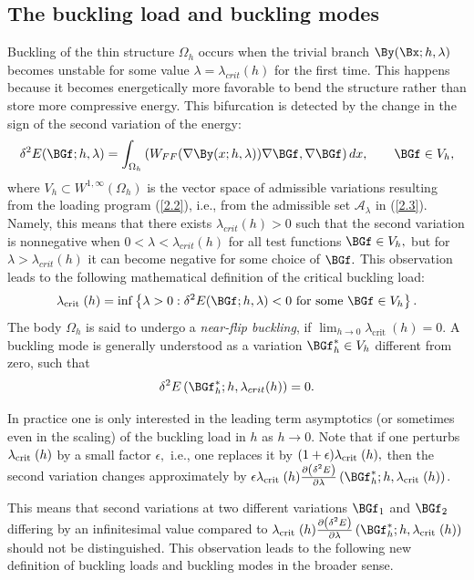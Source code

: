 \subsection{The buckling load and buckling modes}

Buckling of the thin structure $\Omega_h$ occurs when the trivial branch $\By(\Bx; h, \lambda)$ becomes unstable for some value $\lambda=\lambda_{crit}(h)$ for the first time. This happens because it becomes energetically more favorable to bend the structure rather than store more compressive energy. This bifurcation is detected by the change in the sign of the second variation of the energy:
\begin{equation}
\label{2.6}
\delta^{2}E(\BGf ; h, \lambda)=\int_{\Omega_{h}}\left(W_{F F}(\nabla \By(x ; h, \lambda)) \nabla \BGf, \nabla \BGf \right) d x, \qquad \BGf \in V_h,
\end{equation}
where $V_h\subset W^{1,\infty}(\Omega_h)$ is the vector space of admissible variations resulting from the loading program (\ref{2.2}), i.e., from the admissible set 
$\mathcal{A}_\lambda$ in (\ref{2.3}). Namely, this means that there exists $\lambda_{crit}(h)>0$ such that the second variation is nonnegative when $0<\lambda<\lambda_{crit}(h)$ for all test functions $\BGf  \in V_h,$ but for 
$\lambda>\lambda_{crit}(h)$ it can become negative for some choice of $\BGf.$ This observation leads to the following mathematical definition of the critical buckling load:
\begin{equation}
\label{2.7}
\lambda_{\text {crit }}(h)=\inf \left\{\lambda>0: \delta^{2} E(\BGf ; h, \lambda)<0 \text { for some } \BGf \in V_h\right\}.
\end{equation}
The body $\Omega_h$ is said to undergo a \textit{near-flip buckling}, if $\lim_{h\to 0} \lambda_{\text {crit }}(h)=0.$ A buckling mode is generally understood as a variation $\BGf^*_h\in V_h$  different from zero, such that $$\delta^{2} E\left(\BGf_{h}^{*}; h, \lambda_{crit}(h)\right)=0.$$ 

In practice one is only interested in the leading term asymptotics (or sometimes even in the scaling) of the buckling load in $h$ as $h\to 0.$ Note that if one perturbs $\lambda_{\text {crit }}(h)$ by a small factor $\epsilon,$ i.e., one replaces it by $(1+\epsilon)\lambda_{\text {crit }}(h),$ then the second variation changes approximately by $\epsilon\Gl_{\text {crit }}(h) \frac{\partial\left(\delta^{2} E\right)}{\partial \lambda}\left(\BGf_{h}^*; h, \lambda_{\text {crit }}(h)\right)$.

This means that second variations at two different variations $\BGf_1$ and $\BGf_2$ differing by an infinitesimal value compared to  
$\Gl_{\text {crit }}(h) \frac{\partial\left(\delta^{2} E\right)}{\partial \lambda}\left(\BGf_{h}^* ; h, \lambda_{\text {crit }}(h)\right)$ should not be distinguished. This observation leads to the following new definition of buckling loads and buckling modes in the broader sense. 

